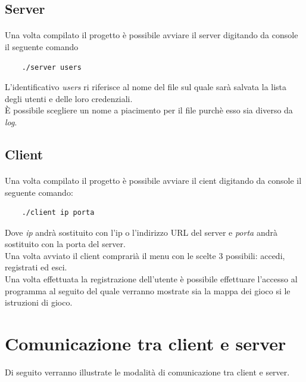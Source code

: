 \documentclass[a4paper]{article}
\begin{document}
\subsection{Server}
\paragraph{}
Una volta compilato il progetto è possibile avviare il server digitando da console il seguente comando
\begin{verbatim}
    ./server users
\end{verbatim}
L'identificativo \textit{users} ri riferisce al nome del file sul quale sarà salvata la lista degli utenti e delle loro credenziali.\\
È possibile scegliere un nome a piacimento per il file purchè esso sia diverso da \textit{log}.
\subsection{Client}
\paragraph{}
Una volta compilato il progetto è possibile avviare il cient digitando da console il seguente comando:
\begin{verbatim}
    ./client ip porta
\end{verbatim}
Dove \textit{ip} andrà sostituito con l'ip o l'indirizzo URL del server e \textit{porta} andrà sostituito con la porta del server.\\
Una volta avviato il client comprarià il menu con le scelte 3 possibili: accedi, registrati ed esci.\\
Una volta effettuata la registrazione dell'utente è possibile effettuare l'accesso al programma al seguito del quale verranno mostrate sia la mappa dei gioco si le istruzioni di gioco.
\pagebreak
\section{Comunicazione tra client e server}
Di seguito verranno illustrate le modalità di comunicazione tra client e server.
\end{document}
